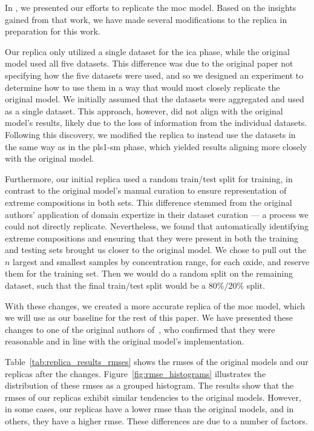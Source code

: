 In \citet{p9_paper}, we presented our efforts to replicate the \gls{moc} model.
Based on the insights gained from that work, we have made several modifications to the replica in preparation for this work.

Our replica only utilized a single dataset for the \gls{ica} phase, while the original model used all five datasets.
This difference was due to the original paper not specifying how the five datasets were used, and so we designed an experiment to determine how to use them in a way that would most closely replicate the original model.
We initially assumed that the datasets were aggregated and used as a single dataset.
This approach, however, did not align with the original model's results, likely due to the loss of information from the individual datasets.
Following this discovery, we modified the replica to instead use the datasets in the same way as in the \gls{pls1-sm} phase, which yielded results aligning more closely with the original model.

Furthermore, our initial replica used a random train/test split for training, in contrast to the original model's manual curation to ensure representation of extreme compositions in both sets.
This difference stemmed from the original authors' application of domain expertize in their dataset curation --- a process we could not directly replicate.
Nevertheless, we found that automatically identifying extreme compositions and ensuring that they were present in both the training and testing sets brought us closer to the original model.
We chose to pull out the $n$ largest and smallest samples by concentration range, for each oxide, and reserve them for the training set.
Then we would do a random split on the remaining dataset, such that the final train/test split would be a $80\%/20\%$ split.

With these changes, we created a more accurate replica of the \gls{moc} model, which we will use as our baseline for the rest of this paper.
We have presented these changes to one of the original authors of~\citet{cleggRecalibrationMarsScience2017}, who confirmed that they were reasonable and in line with the original model's implementation.

Table~\ref{tab:replica_results_rmses} shows the \gls{rmse}s of the original models and our replicas after the changes.
Figure~\ref{fig:rmse_histograms} illustrates the distribution of these \gls{rmse}s as a grouped histogram.
The results show that the \gls{rmse}s of our replicas exhibit similar tendencies to the original models.
However, in some cases, our replicas have a lower \gls{rmse} than the original models, and in others, they have a higher \gls{rmse}.
These differences are due to a number of factors.

